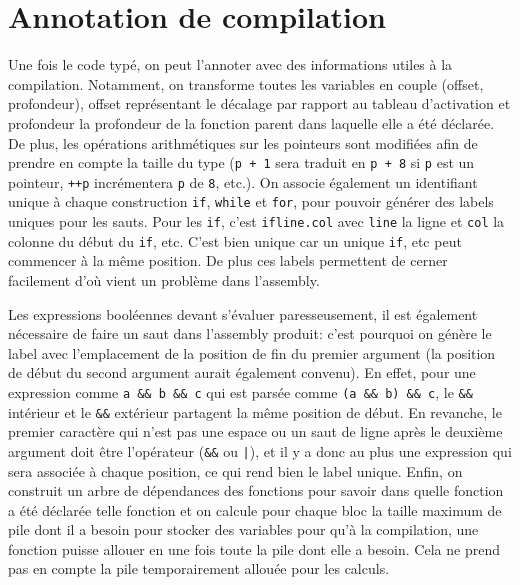 \documentclass{scrartcl}
\begin{document}
\section*{Annotation de compilation}
Une fois le code typé, on peut l'annoter avec des informations utiles à la compilation.
Notamment, on transforme toutes les variables en couple (offset, profondeur), offset représentant
le décalage par rapport au tableau d'activation et profondeur la profondeur de la fonction parent dans
laquelle elle a été déclarée. De plus, les opérations arithmétiques sur les pointeurs sont modifiées afin
de prendre en compte la taille du type (\verb|p + 1| sera traduit en \verb|p + 8| si \verb|p| est
un pointeur, \verb|++p| incrémentera \verb|p| de \verb|8|, etc.). On associe également un identifiant
unique à chaque construction \verb|if|, \verb|while| et \verb|for|, pour pouvoir générer des labels
uniques pour les sauts. Pour les \verb|if|, c'est \verb|ifline.col| avec \verb|line| la ligne et
\verb|col| la colonne du début du \verb|if|, etc. C'est bien unique car un unique \verb|if|, etc peut
commencer à la même position. De plus ces labels permettent de cerner facilement d'où vient un problème
dans l'assembly.\par
Les expressions booléennes devant s'évaluer paresseusement,
il est également nécessaire de faire un saut dans l'assembly produit: c'est pourquoi on génère le label
avec l'emplacement de la position de fin du premier argument (la position de début du second argument
aurait également convenu). En effet, pour une expression comme \verb|a && b && c| qui
est parsée comme \verb|(a && b) && c|, le \verb|&&| intérieur et le \verb|&&| extérieur partagent
la même position de début. En revanche, le premier caractère qui n'est pas une espace
ou un saut de ligne après le deuxième argument doit être l'opérateur (\verb|&&| ou \verb?|?),
et il y a donc au plus une expression qui sera associée à chaque position,
ce qui rend bien le label unique. Enfin,
on construit un arbre de dépendances des fonctions pour savoir dans quelle fonction a été déclarée
telle fonction et on calcule pour chaque bloc la taille maximum de pile dont il a besoin pour stocker
des variables pour qu'à la compilation, une fonction puisse allouer en une fois toute la pile
dont elle a besoin. Cela ne prend pas en compte la pile temporairement allouée pour les calculs.
\end{document}
